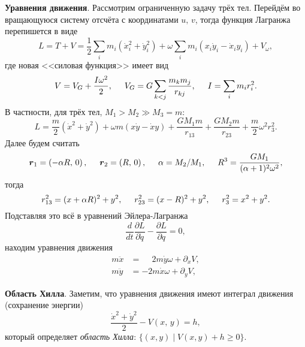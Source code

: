 \textbf{Уравнения движения}.
Рассмотрим ограниченную задачу трёх тел. Перейдём во вращающуюся систему отсчёта с координатами $u,\, v$, тогда функция Лагранжа перепишется в виде
\begin{equation*}
    L = T + V = \frac{1}{2} \sum_i m_i (\dot{x}_i^2 + \dot{y}_i^2) + \omega \sum_i m_i (x_i \dot{y}_i - \dot{x}_i y_i) + V_\omega,
\end{equation*}
где новая <<силовая функция>> имеет вид
\begin{equation*}
    V = V_G + \frac{ I \omega^2}{2},
    \hspace{5 mm} 
    V_G = G \sum_{k < j} \frac{m_k m_j}{r_{kj}},
    \hspace{5 mm} 
    I = \sum_i m_i r_i^2.
\end{equation*}
В частности, для трёх тел, $M_1 > M_2 \gg M_3 = m$:
\begin{equation*}
    L = \frac{m}{2}(\dot{x}^2 + \dot{y}^2) + \omega m (x \dot{y} - \dot{x} y) + \frac{G M_1 m}{r_{13}} + \frac{G M_2 m}{r_{23}} + \frac{m}{2} \omega^2 r_3^2 .
\end{equation*}
Далее будем считать 
\begin{equation*}
    \mbox{\boldmath $r$}_1 = \left(-\alpha R,\, 0\right),
    \hspace{5 mm} 
    \mbox{\boldmath $r$}_2 = \left(R,\, 0\right),
    \hspace{5 mm} 
    \alpha = M_2 / M_1,
    \hspace{5 mm} 
    R^3 = \frac{G M_1}{ (\alpha +1)^2 \omega ^2},
\end{equation*}
тогда
\begin{equation*}
    r_{13}^2 = (x+\alpha R)^2 + y^2,
    \hspace{5 mm} 
    r_{23}^2 = (x-R)^2 + y^2,
    \hspace{5 mm} 
    r_3^2 = x^2 + y^2.
\end{equation*}
Подставляя это всё в уравнений Эйлера-Лагранжа
\begin{equation*}
    \frac{d }{d t} \frac{\partial L}{\partial \dot{q}} - \frac{\partial L}{\partial q} = 0,
\end{equation*}
находим уравнения движения
\begin{align*}
    m \ddot{x} &= \phantom{-}2 m \dot{y} \omega + \partial_x V, \\
    m \ddot{y} &= -2 m \dot{x} \omega + \partial_y V,
\end{align*}



\textbf{Область Хилла}. 
Заметим, что уравнения движения имеют интеграл движения (сохранение энергии)
\begin{equation*}
    \frac{\dot{x}^2 + \dot{y}^2}{2} - V(x,\, y) = h,
\end{equation*}
который определяет \textit{область Хилла}: $\{(x,y) \mid V(x,y) + h \geq 0\}$.

